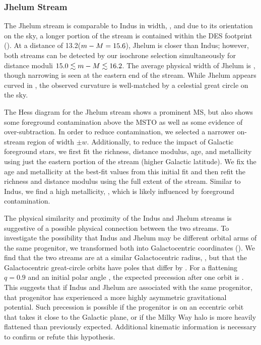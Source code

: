 \documentclass[twocolumn]{aastex61}
\begin{document}
\subsubsection{Jhelum Stream}

The Jhelum stream is comparable to Indus in width, , and due to its orientation on the sky, a longer portion of the stream is contained within the DES footprint ().
At a distance of 13.2\kpc ($m - M = 15.6$), Jhelum is closer than Indus; however, both streams can be detected by our isochrone selection simultaneously for distance moduli $15.0 \lesssim m - M \lesssim 16.2$.
The average physical width of Jhelum is \CHECK{267 pc}, though narrowing is seen at the eastern end of the stream.
While Jhelum appears curved in , the observed curvature is well-matched by a celestial great circle on the sky.

The Hess diagram for the Jhelum stream shows a prominent MS, but also shows some foreground contamination above the MSTO as well as some evidence of over-subtraction. In order to reduce contamination, we selected a narrower on-stream region of width $\pm w$.
Additionally, to reduce the impact of Galactic foreground stars, we first fit the richness, distance modulus, age, and metallicity using just the eastern portion of the stream (higher Galactic latitude).
We fix the age and metallicity at the best-fit values from this initial fit and then refit the richness and distance modulus using the full extent of the stream.
Similar to Indus, we find a high metallicity, , which is likely influenced by foreground contamination.

The physical similarity and proximity of the Indus and Jhelum streams is suggestive of a possible physical connection between the two streams. 
To investigate the possibility that Indus and Jhelum may be different orbital arms of the same progenitor, we transformed both into Galactocentric coordinates (). 
We find that the two streams are at a similar Galactocentric radius, , but that the Galactocentric great-circle orbits have poles that differ by .
For a flattening $q = 0.9$ and an initial polar angle \CHECK{$\psi = 75\degrees$}, the expected precession after one orbit is \CHECK{$\Delta \phi \sim -10\degrees$} \cite{Erkal:2016}. This suggests that if Indus and Jhelum are associated with the same progenitor, that progenitor has experienced a more highly asymmetric gravitational potential.
Such precession is possible if the progenitor is on an eccentric orbit that takes it close to the Galactic plane, or if the Milky Way halo is more heavily flattened than previously expected.
Additional kinematic information is necessary to confirm or refute this hypothesis.
\end{document}
